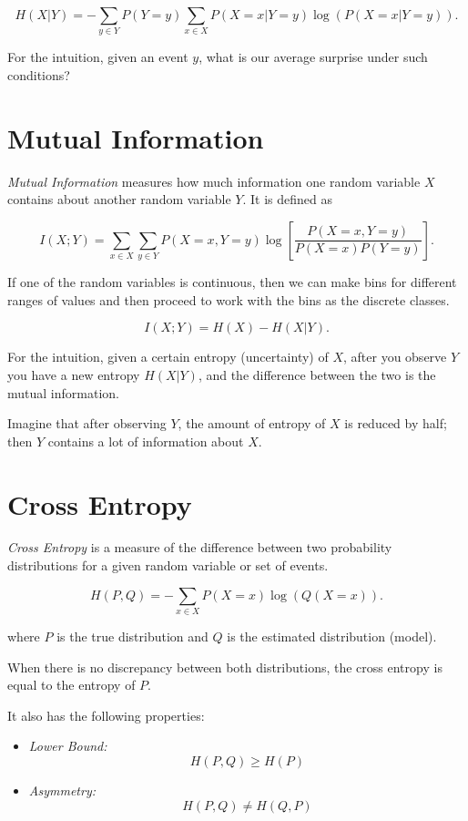 \[
    H(X | Y) = -\sum_{y \in Y} P(Y = y) \sum_{x \in X} P(X = x | Y = y) \log(P(X = x | Y = y)).
\]

For the intuition, given an event \(y\), what is our average surprise under such conditions?

\section{Mutual Information}

\emph{Mutual Information} measures how much information one random variable \(X\) contains about another random variable \(Y\). It is defined as

\[
    I(X; Y) = \sum_{x \in X} \sum_{y \in Y} P(X = x, Y = y) \log \left[\frac{P(X = x, Y = y)}{P(X = x) P(Y = y)} \right].
\]

If one of the random variables is continuous, then we can make bins for different ranges of values and then proceed 
to work with the bins as the discrete classes.

\[
    I(X; Y) = H(X) - H(X | Y).
\]

For the intuition, given a certain entropy (uncertainty) of \(X\), after you observe \(Y\) you have a new entropy \(H(X | Y)\), and the difference between the two is the mutual information.

Imagine that after observing \(Y\), the amount of entropy of \(X\) is reduced by half; then \(Y\) contains a lot of information about \(X\).

\section{Cross Entropy}

\emph{Cross Entropy} is a measure of the difference between two probability distributions for a given random variable or set of 
events.

\[
H(P, Q) = - \sum_{x \in X} P(X = x) \log(Q(X = x)).
\]

where \(P\) is the true distribution and \(Q\) is the estimated distribution (model).   

When there is no discrepancy between both distributions, the cross entropy is equal to the entropy of \(P\).

It also has the following properties:

\begin{itemize}

    \item \emph{Lower Bound:} 
    \[
        H(P,Q) \ge H(P)
    \]

    \item \emph{Asymmetry:}
    \[
        H(P,Q) \ne H(Q, P) 
    \]

\end{itemize}

